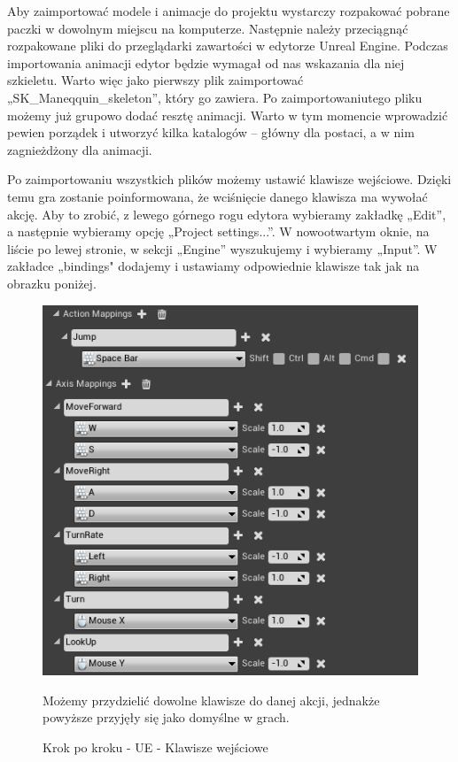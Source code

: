 \documentclass[12pt]{xmgr}
\begin{document}
Aby zaimportować modele i animacje do projektu wystarczy rozpakować pobrane paczki w dowolnym miejscu na komputerze. Następnie należy przeciągnąć rozpakowane pliki do przeglądarki zawartości w edytorze Unreal Engine. Podczas importowania animacji edytor będzie wymagał od nas wskazania dla niej szkieletu. Warto więc jako pierwszy plik zaimportować „SK\_Maneqquin\_skeleton”, który go zawiera. Po zaimportowaniutego pliku możemy już grupowo dodać resztę animacji. Warto w tym momencie wprowadzić pewien porządek i utworzyć kilka katalogów – główny dla postaci, a w nim zagnieżdżony dla animacji.

Po zaimportowaniu wszystkich plików możemy ustawić klawisze wejściowe. Dzięki temu gra zostanie poinformowana, że wciśnięcie danego klawisza ma wywołać akcję. Aby to zrobić, z lewego górnego rogu edytora wybieramy zakładkę „Edit”, a następnie wybieramy opcję „Project settings...”. W nowootwartym oknie, na liście po lewej stronie, w sekcji „Engine” wyszukujemy i wybieramy „Input”. W zakładce „bindings" dodajemy i ustawiamy odpowiednie klawisze tak jak na obrazku poniżej.

\newpage
\begin{figure}[!htb]
    \begin{center}
    \includegraphics[scale=0.75]{Screeny/UeKrokPoKroku/UE-Inputs.png}
    \end{center}
    \caption{Krok po kroku - UE - Klawisze wejściowe}
     Możemy przydzielić dowolne klawisze do danej akcji, jednakże powyższe przyjęły się jako domyślne w grach.
\end{figure}
\end{document}
